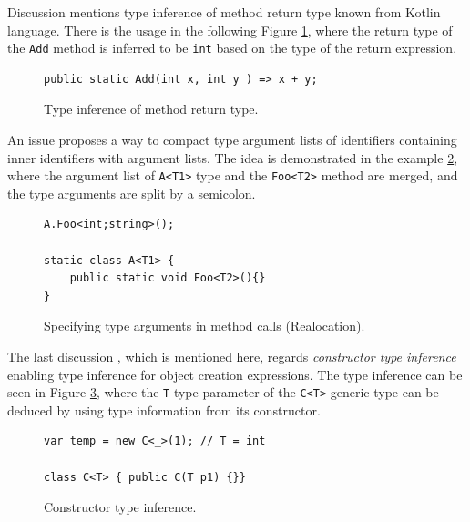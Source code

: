 \par
Discussion \cite{online:TMRetInf} mentions type inference of method return type known from Kotlin language.
There is the usage in the following Figure \ref{img24:TMRetInf}, where the return type of the \texttt{Add} method is inferred to be \texttt{int} based on the type of the return expression.
\begin{figure}[h]
\begin{lstlisting}[style=csharp]
public static Add(int x, int y ) => x + y;
\end{lstlisting}
\caption{Type inference of method return type.}
\label{img24:TMRetInf}
\end{figure}
\par
An issue \cite{online:Realloc} proposes a way to compact type argument lists of identifiers containing inner identifiers with argument lists. 
The idea is demonstrated in the example \ref{img25:Realloc}, where the argument list of \texttt{A<T1>} type and the \texttt{Foo<T2>} method are merged, and the type arguments are split by a semicolon.
\begin{figure}[h]
\begin{lstlisting}[style=csharp]
A.Foo<int;string>();

static class A<T1> {
    public static void Foo<T2>(){}
}
\end{lstlisting}
\caption{Specifying type arguments in method calls (Realocation).}
\label{img25:Realloc}
\end{figure}
\par
The last discussion \cite{online:CtorTInf}, which is mentioned here, regards \textit{constructor type inference} enabling type inference for object creation expressions. 
The type inference can be seen in Figure \ref{img66:CtorTInf}, where the \texttt{T} type parameter of the \texttt{C<T>} generic type can be deduced by using type information from its constructor.
\begin{figure}[h]
\begin{lstlisting}[style=csharp]
var temp = new C<_>(1); // T = int

class C<T> { public C(T p1) {}}
\end{lstlisting}
\caption{Constructor type inference.}
\label{img66:CtorTInf}
\end{figure}
